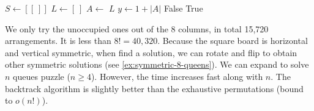 \documentclass[b5paper]{article}
\begin{document}
\begin{algorithmic}[1]
  \State $S \gets [[\ ]]$
  \State $L \gets [\ ]$ 
    \State $A \gets$  
      \State {}
    \Else
          \State {}
        \EndIf
      \EndFor
    \EndIf
  \EndWhile
  \State \Return $L$
\EndFunction
\Statex
{}
  \State $y \gets 1 + |A|$
      \State \Return False
    \EndIf
  \EndFor
  \State \Return True
\EndFunction
\end{algorithmic}

We only try the unoccupied ones out of the 8 columns, in total 15,720 arrangements. It is less than $8! = 40,320$\cite{wiki-8-queens}. Because the square board is horizontal and vertical symmetric, when find a solution, we can rotate and flip to obtain other symmetric solutions (see \cref{ex:symmetric-8-queens}). We can expand to solve $n$ queues puzzle ($n \geq 4$). However, the time increases fast along with $n$. The backtrack algorithm is slightly better than the exhaustive permutations (bound to $o(n!)$).

\begin{Exercise}[label={ex:queens-puzzle}]

\end{Exercise}
\end{document}
